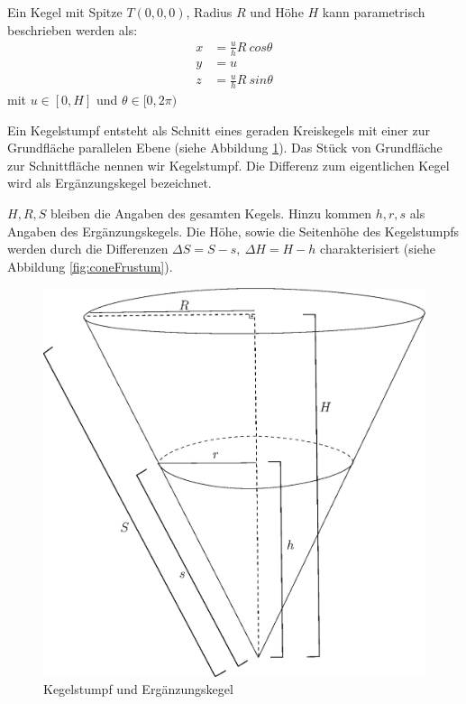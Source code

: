 Ein Kegel mit Spitze $T(0,0,0)$, Radius $R$ und Höhe $H$ kann parametrisch beschrieben werden als:
\begin{equation}
\begin{aligned}
x &= \frac{u}{h} R~cos \theta \\
y &= u \\
z &= \frac{u}{h} R~sin \theta
\end{aligned}
\end{equation}
mit $u\in [0, H]$ und $\theta \in [0, 2\pi)$ 


\begin{definition}
	Ein Kegelstumpf entsteht als Schnitt eines geraden Kreiskegels mit einer zur Grundfläche parallelen Ebene (siehe Abbildung \ref{fig:coneWithFrustum}). Das Stück von Grundfläche zur Schnittfläche nennen wir Kegelstumpf. Die Differenz zum eigentlichen Kegel wird als Ergänzungskegel bezeichnet. 
	
	$H, R, S$ bleiben die Angaben des gesamten Kegels. Hinzu kommen $h,r,s$ als Angaben des Ergänzungskegels. Die Höhe, sowie die Seitenhöhe des Kegelstumpfs werden durch die Differenzen $\Delta S = S - s,~ \Delta H = H-h$ charakterisiert (siehe Abbildung \ref{fig:coneFrustum}).
\end{definition}

\begin{figure}[!htb]
	\centering
	\includegraphics[scale=.5]{images/fullCone3.eps}
	\caption{Kegelstumpf und Ergänzungskegel}
	\label{fig:coneWithFrustum}
\end{figure}

